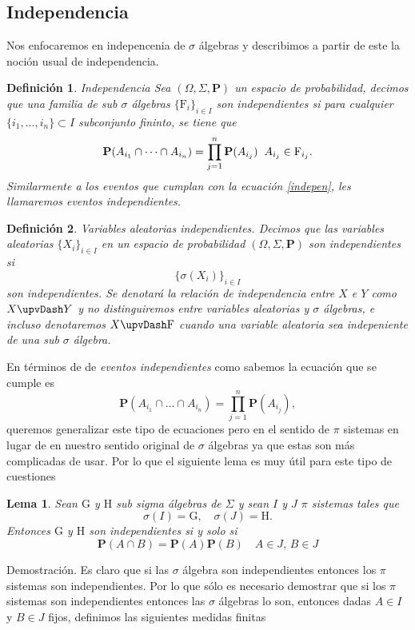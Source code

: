 \documentclass[letterpaper]{article}
\newtheorem{lema}[teorema]{Lema}
\newtheorem{def.}{Definici\'on}[section]
\newcommand{\prob}{\textbf{P}}
\newcommand{\dem}{{\noindent \sc Demostraci\'on. }}
\newcommand{\om}{\ensuremath{\Omega}}
\newcommand{\sig}{\ensuremath{\Sigma}}
\begin{document}
\subsection{Independencia}
\label{sec:orgc713ac3}
\noindent Nos enfocaremos en indepencenia de \(\sigma\) álgebras y describimos a partir de este la noción usual de independencia.
\begin{def.}{Independencia}
Sea \((\om,\sig,\prob)\) un espacio de probabilidad, decimos que una familia de sub \(\sigma\) álgebras \(\{\mathrm{F}_i\}_{i\in I}\) son \emph{independientes} si para cualquier \(\{i_1,\dots,i_n\}\subset I\) subconjunto fininto, se tiene que
\begin{equation}\label{indepen}
    \prob(A_{i_1}\cap\dots\cap A_{i_n})=\prod_{j=1}^n\prob(A_{i_j})\hspace{0.2cm}A_{i_j}\in\mathrm{F}_{i_j}.
\end{equation}
Similarmente a los eventos que cumplan con la ecuación \ref{indepen}, les llamaremos eventos \emph{independientes}.
\end{def.}
\begin{def.}{Variables aleatorias independientes.}
Decimos que las variables aleatorias \(\{X_i\}_{i\in I}\) en un espacio de probabilidad \((\om,\sig,\prob)\) son \emph{independientes} si \[\{\sigma(X_i)\}_{i\in I}\] son independientes. Se denotará la relación de independencia entre \(X\) e \(Y\) como \(X\upvDash Y\) y no distinguiremos entre variables aleatorias y \(\sigma\) álgebras, e incluso denotaremos \(X\upvDash\mathrm{F}\) cuando una variable aleatoria sea indepeniente de una sub \(\sigma\) álgebra.
\end{def.}
En términos de de \emph{eventos independientes} como sabemos la ecuación que se cumple es
\[
    \prob(A_{i_1}\cap\dots\cap A_{i_n})=\prod_{j=1}^n\prob(A_{i_j}),
\]
\noindent queremos generalizar este tipo de ecuaciones pero en el sentido de \(\pi\) sistemas en lugar de en nuestro sentido original de \(\sigma\) álgebras ya que estas son más complicadas de usar. Por lo que el siguiente lema es muy útil para este tipo de cuestiones
\begin{lema}
Sean $\mathrm{G}$ y $\mathrm{H}$ sub sigma álgebras de $\sig$ y sean $I$ y $J$ $\pi$ sistemas tales que
\[
    \sigma(I)=\mathrm{G},\quad\sigma(J)=\mathrm{H}.
\]
Entonces $\mathrm{G}$ y $\mathrm{H}$ son independientes si y solo si
\[
    \prob(A\cap B)=\prob(A)\prob(B)\quad A\in J,\,B\in J
\]
\end{lema}
\dem
Es claro que si las \(\sigma\) álgebra son independientes entonces los \(\pi\) sistemas son independientes. Por lo que sólo es necesario demostrar que si los \(\pi\) sistemas son independientes entonces las \(\sigma\) álgebras lo son, entonces dadas \(A\in I\) y \(B\in J\) fijos, definimos las siguientes medidas finitas
\end{document}
